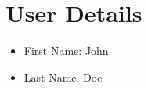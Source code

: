 \documentclass{article}
\begin{document}
\section*{User Details}
\begin{itemize}
  \item First Name: {John}
  \item Last Name: {Doe}
\end{itemize}
\end{document}
